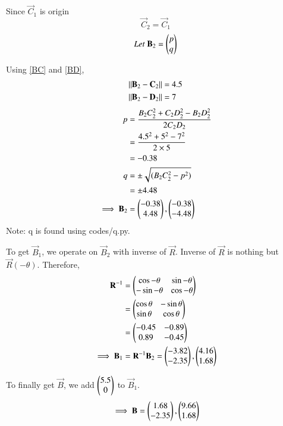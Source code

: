 \documentclass[journal,12pt,twocolumn]{IEEEtran}
\begin{document}
Since $\vec{C}_1$ is origin
\begin{equation}
    \vec{C}_2 = \vec{C}_1
\end{equation}
\begin{equation}
    Let\; \mathbf{B}_2 = \begin{pmatrix}p\\q\end{pmatrix}
\end{equation}

Using \ref{BC} and \ref{BD},
\begin{align}
    \lVert\mathbf{B}_2-\mathbf{C}_2\rVert &= 4.5\\
    \lVert\mathbf{B}_2-\mathbf{D}_2\rVert &= 7
\end{align}
\begin{align}
    p &= \dfrac{B_2C_2^2+C_2D_2^2-B_2D_2^2}{2C_2D_2}\\
      &= \dfrac{4.5^2+5^2-7^2}{2\times 5}\\
      &= -0.38\\
    q &= \pm \sqrt{(B_2C_2^2-p^2)}\\
      &= \pm 4.48\\
    \implies \mathbf{B}_2 &= \begin{pmatrix}-0.38\\4.48\end{pmatrix}, \begin{pmatrix}-0.38\\-4.48\end{pmatrix}
\end{align}
Note: q is found using codes/q.py. 

To get $\vec{B}_1$, we operate on $\vec{B}_2$ with inverse of $\vec{R}$. Inverse of $\vec{R}$ is nothing but $\vec{R}(-\theta)$. Therefore,
\begin{align}
    \mathbf{R}^{-1} &= \begin{pmatrix}\cos{-\theta}& \sin{-\theta}\\ -\sin{-\theta} & \cos{-\theta}\end{pmatrix}\\
                 &= \begin{pmatrix}\cos{\theta}& -\sin{\theta}\\ \sin{\theta} & \cos{\theta}\end{pmatrix}\\
                 &= \begin{pmatrix}-0.45 & -0.89\\0.89 & -0.45\end{pmatrix}\\
    \implies \mathbf{B}_1 &= \mathbf{R}^{-1}\mathbf{B}_2 = \begin{pmatrix}-3.82\\-2.35\end{pmatrix}, \begin{pmatrix}4.16\\1.68\end{pmatrix}
\end{align}

To finally get $\vec{B}$, we add $\begin{pmatrix}5.5\\0\end{pmatrix}$ to $\vec{B}_1$.
\begin{equation}
    \implies \mathbf{B} = \begin{pmatrix}1.68\\-2.35\end{pmatrix}, \begin{pmatrix}9.66\\1.68\end{pmatrix}
\end{equation}
\end{document}
